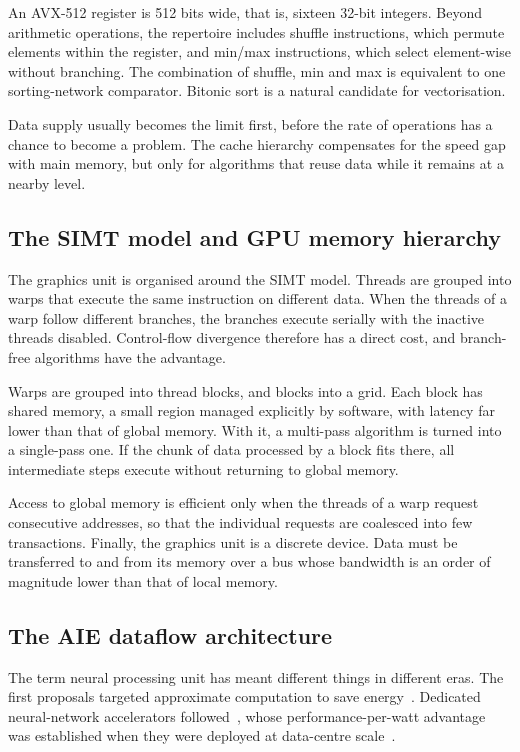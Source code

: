 An AVX-512 register is 512 bits wide, that is, sixteen 32-bit integers. Beyond
arithmetic operations, the repertoire includes shuffle instructions, which
permute elements within the register, and min/max instructions, which select
element-wise without branching. The combination of shuffle, min and max is
equivalent to one sorting-network comparator. Bitonic sort is a natural
candidate for vectorisation.

Data supply usually becomes the limit first, before the rate of operations has
a chance to become a problem. The cache hierarchy compensates for the speed gap
with main memory, but only for algorithms that reuse data while it remains at a
nearby level.

\subsection{The SIMT model and GPU memory hierarchy}
\label{sec:bg-arch-gpu}

The graphics unit is organised around the SIMT model. Threads are grouped into
warps that execute the same instruction on different data. When the threads of
a warp follow different branches, the branches execute serially with the
inactive threads disabled. Control-flow divergence therefore has a direct cost,
and branch-free algorithms have the advantage.

Warps are grouped into thread blocks, and blocks into a grid. Each block has
shared memory, a small region managed explicitly by software, with latency far
lower than that of global memory. With it, a multi-pass algorithm is turned
into a single-pass one. If the chunk of data processed by a block fits there,
all intermediate steps execute without returning to global memory.

Access to global memory is efficient only when the threads of a warp request
consecutive addresses, so that the individual requests are coalesced into few
transactions. Finally, the graphics unit is a discrete device. Data must be
transferred to and from its memory over a bus whose bandwidth is an order of
magnitude lower than that of local memory.

\subsection{The AIE dataflow architecture}
\label{sec:bg-arch-npu}

The term neural processing unit has meant different things in different eras.
The first proposals targeted approximate computation to save
energy~\cite{palmer2014npu,esmaeilzadeh2012}. Dedicated neural-network
accelerators followed~\cite{chen2014diannao}, whose performance-per-watt
advantage was established when they were deployed at data-centre
scale~\cite{jouppi2017tpu}.

